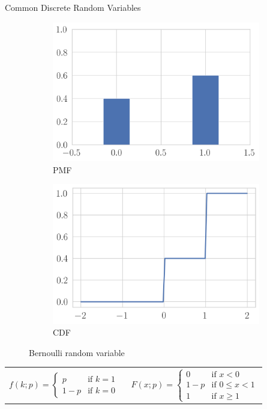 \documentclass[11pt, xcolor={dvipsnames}, hyperref={colorlinks, allcolors=Blue}]{beamer}
\begin{document}
\begin{frame}{Common Discrete Random Variables}

\begin{figure}[t]
	\begin{subfigure}[b]{0.4\textwidth}
		\centering
		\includegraphics[width=\textwidth]{bernoulli_pmf.png}
		\caption*{PMF}
	\end{subfigure}
	\begin{subfigure}[b]{0.4\textwidth}
		\centering
		\includegraphics[width=\textwidth]{bernoulli_cdf.png}
		\caption*{CDF}
	\end{subfigure}
\caption{Bernoulli random variable}
\end{figure}

\begin{center}
\begin{tabular}{cc}
$f(k; p) = \begin{cases} p & \text{if } k=1 \\ 1-p & \text{if } k = 0\end{cases}$ & \ 
$F(x; p) = \begin{cases} 0 & \text{if } x< 0 \\ 1-p & \text{if } 0 \leq x < 1 \\1 & \text{if } x \geq 1  \end{cases}$
\end{tabular}
\end{center}

\end{frame}
\end{document}
